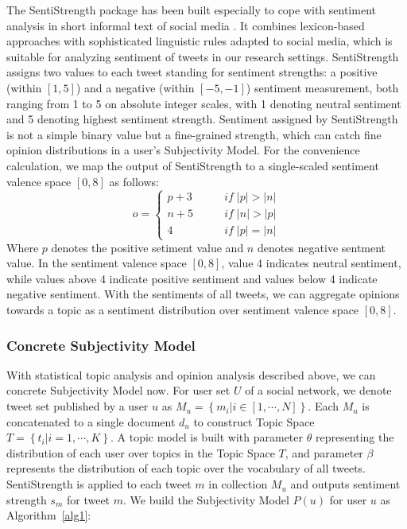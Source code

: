 \documentclass[runningheads,a4paper]{llncs}
\begin{document}
The SentiStrength package has been built especially to cope with sentiment analysis in short informal text of social media \cite{thelwall2010sentiment}. 
It combines lexicon-based approaches with sophisticated linguistic rules adapted to social media, which is suitable for analyzing sentiment of tweets in our research settings. 
SentiStrength assigns two values to each tweet standing for sentiment strengths: a positive (within $ [1,5] $) and a negative (within $ [-5,-1] $) sentiment measurement, both ranging from 1 to 5 on absolute integer scales, with 1 denoting neutral sentiment and 5 denoting highest sentiment strength. 
Sentiment assigned by SentiStrength is not a simple binary value but a fine-grained strength, which can catch fine opinion distributions in a user's Subjectivity Model. 
For the convenience calculation, we map the output of SentiStrength to a single-scaled sentiment valence space $ [0, 8] $ as follows: 
\begin{equation}
\label{opinionmap}
o= \left\{ 
\begin{array}{lll}
{p+3} &  \qquad if \; \vert p \vert > \vert n \vert \\
{n+5} &  \qquad if \; \vert n \vert > \vert p \vert \\
{4}  &   \qquad if \; \vert p \vert = \vert n \vert
\end{array}
\right.
\end{equation}
Where $ p $ denotes the positive setiment value and $ n $ denotes negative sentment value.
In the sentiment valence space $ [0, 8] $, value 4 indicates neutral sentiment, while values above 4 indicate positive sentiment and values below 4 indicate negative sentiment. With the sentiments of all tweets, we can aggregate opinions towards a topic as a sentiment distribution over sentiment valence space $ [0, 8] $.

\subsubsection{Concrete Subjectivity Model}
\label{concrete}

With statistical topic analysis and opinion analysis described above, we can concrete Subjectivity Model now. 
For user set $ U $ of a social network, we denote tweet set published by a user $ u $ as $ M_{u}=\left\lbrace m_{i} \vert i \in \left[ 1, \cdots, N \right]  \right\rbrace$. Each $ M_{u} $ is concatenated to a single document $ d_{u} $ to construct Topic Space $ T=\left\lbrace t_{i} \vert i=1, \cdots, K \right\rbrace $.
A topic model is built with parameter $ \theta $ representing the distribution of each user over topics in the Topic Space $ T $, and
parameter $ \beta $ represents the distribution of each topic over the vocabulary of all tweets. SentiStrength is applied to each tweet $ m $ in collection $ M_{u} $ and outputs sentiment strength $ s_{m} $ for tweet $ m $. 
We build the Subjectivity Model $ P(u) $ for user $ u $ as Algorithm~\ref{alg1}:
\end{document}
